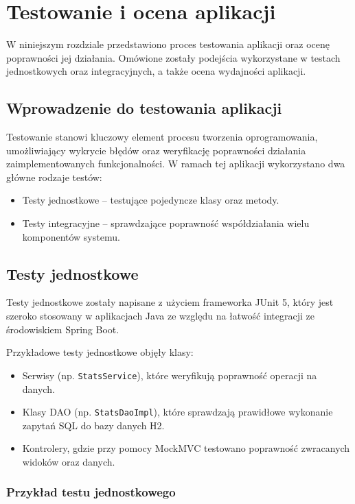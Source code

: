 \chapter{Testowanie i ocena aplikacji}

W niniejszym rozdziale przedstawiono proces testowania aplikacji oraz ocenę poprawności jej działania. Omówione zostały podejścia wykorzystane w testach jednostkowych oraz integracyjnych, a także ocena wydajności aplikacji.

\section{Wprowadzenie do testowania aplikacji}

Testowanie stanowi kluczowy element procesu tworzenia oprogramowania, umożliwiający wykrycie błędów oraz weryfikację poprawności działania zaimplementowanych funkcjonalności. W ramach tej aplikacji wykorzystano dwa główne rodzaje testów:

\begin{itemize}
    \item Testy jednostkowe – testujące pojedyncze klasy oraz metody.
    \item Testy integracyjne – sprawdzające poprawność współdziałania wielu komponentów systemu.
\end{itemize}

\section{Testy jednostkowe}

Testy jednostkowe zostały napisane z użyciem frameworka JUnit 5, który jest szeroko stosowany w aplikacjach Java ze względu na łatwość integracji ze środowiskiem Spring Boot. 

Przykładowe testy jednostkowe objęły klasy:

\begin{itemize}
    \item Serwisy (np. \texttt{StatsService}), które weryfikują poprawność operacji na danych.
    \item Klasy DAO (np. \texttt{StatsDaoImpl}), które sprawdzają prawidłowe wykonanie zapytań SQL do bazy danych H2.
    \item Kontrolery, gdzie przy pomocy MockMVC testowano poprawność zwracanych widoków oraz danych.
\end{itemize}

\subsection{Przykład testu jednostkowego}

